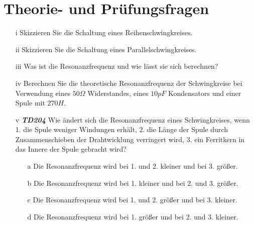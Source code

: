 \section{Theorie- und Prüfungsfragen}


\begin{enumerate}
\itemsep1pt\parskip0pt
\item[i] Skizzieren Sie die Schaltung eines Reihenschwingkreises.
\item[ii] Skizzieren Sie die Schaltung eines Parallelschwingkreises.
\item[iii] Was ist die Resonanzfrequenz und wie lässt sie sich berechnen?
\item[iv] Berechnen Sie die theoretische Resonanzfrequenz der Schwingkreise bei Verwendung eines $50\Omega$ Widerstandes, eines $10pF$ Kondensators und einer Spule mit $270H$.
\end{enumerate}



\begin{enumerate}
\item[v] \emph{\textbf{TD204}}    Wie ändert sich die Resonanzfrequenz eines Schwingkreises, wenn 1. die Spule weniger Windungen erhält, 2. die Länge der Spule durch Zusammenschieben der Drahtwicklung verringert wird, 3. ein Ferritkern in das Innere der Spule gebracht wird? 
	\begin{enumerate}
	\itemsep1pt\parskip0pt
		\item[a] Die Resonanzfrequenz wird bei 1. und 2. kleiner und bei 3. größer. 
		\item[b] Die Resonanzfrequenz wird bei 1. kleiner und bei 2. und 3. größer.
		\item[c] Die Resonanzfrequenz wird bei 1. und 2. größer und bei 3. kleiner.
		\item[d] Die Resonanzfrequenz wird bei 1. größer und bei 2. und 3. kleiner. 
	\end{enumerate}
\end{enumerate}



